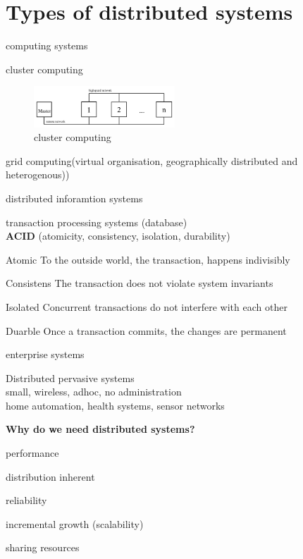 \documentclass[ngerman,a4paper]{report}
\begin{document}
\section{Types of distributed systems}
\begin{compactitem}
\item computing systems
\begin{compactitem}
\item cluster computing
\begin{figure}[h]
	\centering
	\includegraphics[width=200px]{gfx/cluster_computing.png}
	\caption{cluster computing}
	\label{img:cluster_comp}
\end{figure}
\item grid computing(virtual organisation, geographically distributed and heterogenous))
\end{compactitem}
\item distributed inforamtion systems
\begin{compactitem}
\item transaction processing systems (database) \\
\textbf{ACID} (atomicity, consistency, isolation, durability)
\begin{compactitem}
\item[Atomic] To the outside world, the transaction, happens indivisibly
\item[Consistens] The transaction does not violate system invariants
\item[Isolated] Concurrent transactions do not interfere with each other
\item[Duarble] Once a transaction commits, the changes are permanent
\end{compactitem}
\item enterprise systems
\end{compactitem}
\item Distributed pervasive systems\\
small, wireless, adhoc, no administration\\
home automation, health systems, sensor networks
\end{compactitem}

\textbf{Why do we need distributed systems?}\\
\begin{compactitem}
\item performance
\item distribution inherent
\item reliability
\item incremental growth (scalability)
\item sharing resources
\end{compactitem}
\end{document}
